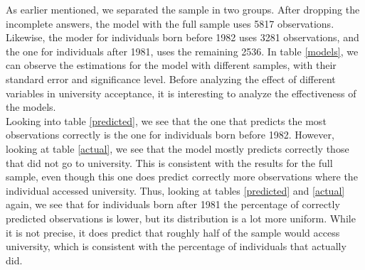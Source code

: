 \documentclass[12pt]{article}
\begin{document}
As earlier mentioned, we separated the sample in two groups. After dropping the incomplete answers, the model with the full sample uses 5817 observations. Likewise, the moder for individuals born before 1982 uses 3281 observations, and the one for individuals after 1981, uses the remaining 2536. In table \ref{models}, we can observe the estimations for the model with different samples, with their standard error and significance level. Before analyzing the effect of different variables in university acceptance, it is interesting to analyze the effectiveness of the models. \\
Looking into table \ref{predicted}, we see that the one that predicts the most observations correctly is the one for individuals born before 1982. However, looking at table \ref{actual}, we see that the model mostly predicts correctly those that did not go to university. This is consistent with the results for the full sample, even though this one does predict correctly more observations where the individual accessed university. Thus, looking at tables \ref{predicted} and \ref{actual} again, we see that for individuals born after 1981 the percentage of correctly predicted observations is lower, but its distribution is a lot more uniform. While it is not precise, it does predict that roughly half of the sample would access university, which is consistent with the percentage of individuals that actually did.
\end{document}
